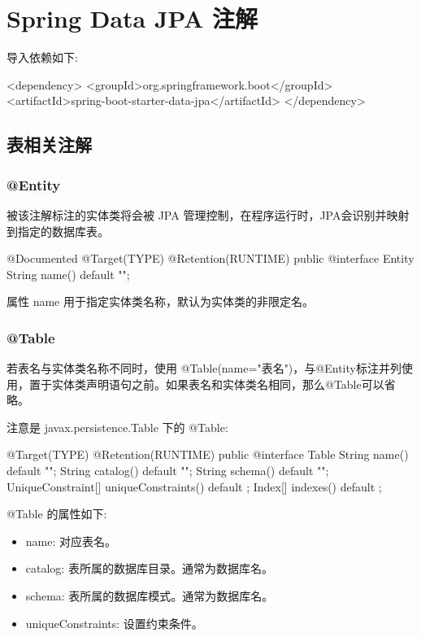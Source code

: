 \section{Spring Data JPA 注解}

导入依赖如下:

\begin{Java}
<dependency>
    <groupId>org.springframework.boot</groupId>
    <artifactId>spring-boot-starter-data-jpa</artifactId>
</dependency>
\end{Java}

\subsection{表相关注解}

\subsubsection{@Entity}

被该注解标注的实体类将会被 JPA 管理控制，在程序运行时，JPA会识别并映射到指定的数据库表。

\begin{Java}
@Documented
@Target(TYPE)
@Retention(RUNTIME)
public @interface Entity {
	String name() default "";
}
\end{Java}

属性 name 用于指定实体类名称，默认为实体类的非限定名。

\subsubsection{@Table}

若表名与实体类名称不同时，使用 @Table(name="表名")，与@Entity标注并列使用，置于实体类声明语句之前。如果表名和实体类名相同，那么@Table可以省略。

注意是 javax.persistence.Table 下的 @Table:

\begin{Java}
@Target(TYPE) 
@Retention(RUNTIME)
public @interface Table {
    String name() default "";
    String catalog() default "";
    String schema() default "";
    UniqueConstraint[] uniqueConstraints() default {};
    Index[] indexes() default {};
}
\end{Java}

@Table 的属性如下:
\begin{itemize}
    \item name: 对应表名。
    \item catalog: 表所属的数据库目录。通常为数据库名。
    \item schema: 表所属的数据库模式。通常为数据库名。
    \item uniqueConstraints: 设置约束条件。
\end{itemize}

